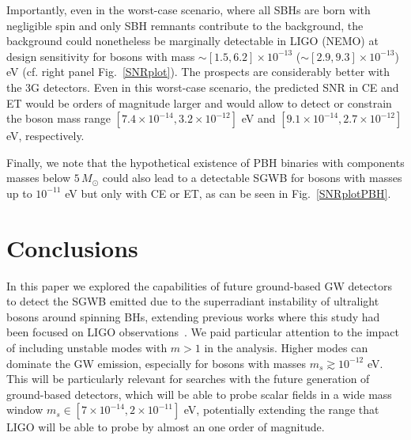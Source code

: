 \documentclass[
reprint,           %
superscriptaddress,%
amsmath,           %
amssymb,           %
aps,               %
prd,               %
notitlepage,       %
floatfix,          %
nofootinbib %
]{revtex4-1}
\begin{document}
Importantly, even in the worst-case scenario, where all SBHs are born with negligible spin and only SBH remnants contribute to the background, the background could nonetheless be marginally detectable in LIGO (NEMO) at design sensitivity for bosons with mass $\sim [1.5 , 6.2]\times 10^{-13}$ ($\sim [2.9 , 9.3]\times 10^{-13}$) eV (cf. right panel Fig.~\ref{SNRplot}). The prospects are considerably better with the 3G detectors. Even in this worst-case scenario, the predicted SNR in CE and ET would be orders of magnitude larger and would allow to detect or constrain the boson mass range  $[7.4\times 10^{-14} , 3.2 \times 10^{-12}]$ eV and $[9.1\times 10^{-14} , 2.7 \times 10^{-12}]$ eV, respectively.

Finally, we note that the hypothetical existence of PBH binaries with components masses below $5\, M_{\odot}$ could also lead to a detectable SGWB for bosons with masses up to $10^{-11}$ eV but only with CE or ET, as can be seen in Fig.~\ref{SNRplotPBH}. 



\section{Conclusions}
In this paper we explored the capabilities of future ground-based GW detectors to detect the SGWB emitted due to the superradiant instability of ultralight bosons around spinning BHs, extending previous works where this study had been focused on LIGO observations~\cite{Brito:2017wnc,Tsukada:2018mbp,Tsukada:2020lgt}. We paid particular attention to the impact of including unstable modes with $m>1$ in the analysis. Higher modes can dominate the GW emission, especially for bosons with masses $m_s\gtrsim 10^{-12}$ eV. This will be particularly relevant for searches with the future generation of ground-based detectors, which will be able to probe scalar fields in a wide mass window $m_s\in [7\times10^{-14}, 2\times 10^{-11}]$ eV, potentially extending the range that LIGO will be able to probe by almost an one order of magnitude. 

\end{document}
